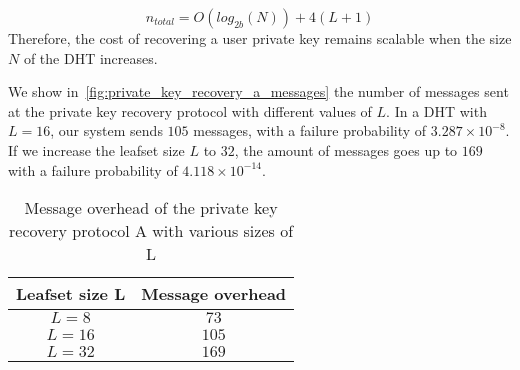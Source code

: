     $$
      n_{total} = O(log_{2b}(N)) + 4(L+1)
    $$
    Therefore, the cost of recovering a user private key remains
scalable when the size $N$ of the DHT increases.

    We show in~\ref{fig:private_key_recovery_a_messages} the number of messages sent at
the private key recovery protocol with different values of $L$. In a DHT with
$L = 16$, our system sends $105$ messages, with a failure probability of
 $3.287 \times 10^{-8}$. If we increase the leafset size $L$ to $32$, the amount of
messages goes up to $169$ with a failure probability of $4.118 \times 10^{-14}$.



\begin{table}
  \centering
  \footnotesize
  \begin{tabular}{|c|c|}
    \hline
     \textbf{Leafset size L} & \textbf{Message overhead}\\
    \hline
      $L = 8$ & $73$\\
    \hline
      $L = 16$ & $105$\\
    \hline
      $L = 32$ & $169$\\
    \hline
  \end{tabular}
  \caption{Message overhead of the private key recovery protocol A with various sizes of L}
  \label{tab:private_key_recovery_a_messages}
\end{table}

